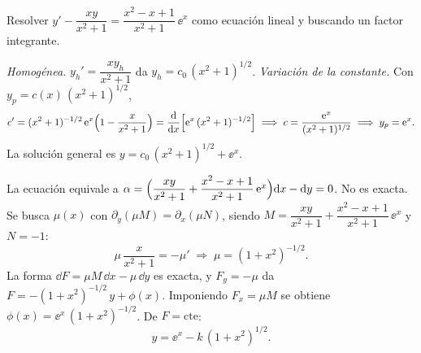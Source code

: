 \begin{example}
Resolver $y'-\dfrac{xy}{x^2+1}=\dfrac{x^2-x+1}{x^2+1}\,\ee^x$ como ecuación lineal y buscando un factor integrante.

\emph{Homogénea.} $y_h'=\dfrac{xy_h}{x^2+1}$ da $y_h=c_0\,(x^2+1)^{1/2}$. \emph{Variación de la constante.} Con $y_p=c(x)\,(x^2+1)^{1/2}$,
\[
  c'=(x^2+1)^{-1/2}\,\mathrm{e}^x\Bigl(1-\frac{x}{x^2+1}\Bigr)=\dfrac{\mathrm{d} }{\mathrm{d} x}\Bigl[\mathrm{e}^x\,(x^2+1)^{-1/2}\Bigr]
  \;\Longrightarrow\;c=\frac{\mathrm{e}^x}{(x^2+1)^{1/2}}\;\Longrightarrow\;y_p=\mathrm{e}^x .
\]
La solución general es $y=c_0\,(x^2+1)^{1/2}+\ee^x$.

La ecuación equivale a $\alpha=\Bigl(\dfrac{xy}{x^2+1}+\dfrac{x^2-x+1}{x^2+1}\,\mathrm{e}^x\Bigr)\mathrm{d} x-\mathrm{d} y=0$. No es exacta. Se busca $\mu(x)$ con $\partial_y(\mu M)=\partial_x(\mu N)$, siendo $M=\dfrac{xy}{x^2+1}+\dfrac{x^2-x+1}{x^2+1}\,\ee^x$ y $N=-1$:
\[
  \mu\,\frac{x}{x^2+1}=-\mu'\;\Longrightarrow\;\mu=(1+x^2)^{-1/2}.
\]
La forma $\dd F=\mu M\,\dd x-\mu\,\dd y$ es exacta, y $F_y=-\mu$ da $F=-(1+x^2)^{-1/2}\,y+\phi(x)$. Imponiendo $F_x=\mu M$ se obtiene $\phi(x)=\ee^x\,(1+x^2)^{-1/2}$. De $F=\text{cte}$:
\[
  y=\ee^x-k\,(1+x^2)^{1/2}.
\]
\finejemplo
\end{example}
